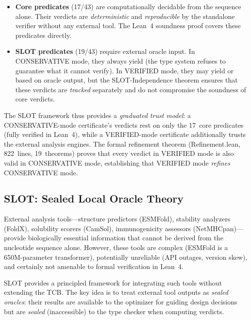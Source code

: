 \begin{itemize}[leftmargin=*,itemsep=0pt,topsep=1pt]
\item \textbf{Core predicates} (17/43) are computationally decidable
      from the sequence alone.
      Their verdicts are \emph{deterministic} and \emph{reproducible}
      by the standalone verifier without any external tool.
      The Lean~4 soundness proof covers these predicates directly.

\item \textbf{SLOT predicates} (19/43) require external oracle input.
      In CONSERVATIVE mode, they always yield \UNCERTAIN{} (the type
      system refuses to guarantee what it cannot verify).
      In VERIFIED mode, they may yield \PASS{} or \FAIL{} based on
      oracle output, but the SLOT-Independence theorem ensures that
      these verdicts are \emph{tracked} separately and do not
      compromise the soundness of core verdicts.
\end{itemize}

\noindent The SLOT framework thus provides a \emph{graduated trust
model}: a CONSERVATIVE-mode certificate's \PASS{} verdicts rest on
only the 17~core predicates (fully verified in Lean~4), while a
VERIFIED-mode certificate additionally trusts the external analysis
engines.
The formal refinement theorem (Refinement.lean, 822~lines,
19~theorems) proves that every \PASS{} verdict in VERIFIED mode is
also valid in CONSERVATIVE mode, establishing that VERIFIED mode
\emph{refines} CONSERVATIVE mode.

\subsection{SLOT: Sealed Local Oracle Theory}\label{sec:slot}

External analysis tools---structure predictors (ESMFold), stability
analyzers (FoldX), solubility scorers (CamSol), immunogenicity
assessors (NetMHCpan)---provide biologically essential information
that cannot be derived from the nucleotide sequence alone.
However, these tools are complex (ESMFold is a 650M-parameter
transformer), potentially unreliable (API outages, version skew), and
certainly not amenable to formal verification in Lean~4.

SLOT provides a principled framework for integrating such tools
without extending the TCB.
The key idea is to treat external tool outputs as \emph{sealed
oracles}: their results are available to the optimizer for guiding
design decisions but are \emph{sealed} (inaccessible) to the type
checker when computing verdicts.

